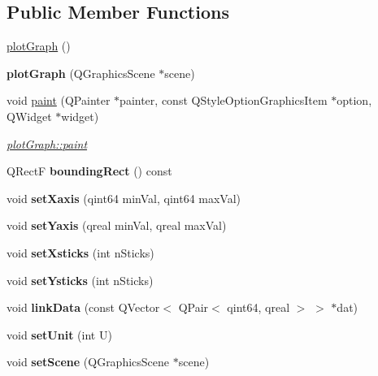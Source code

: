 \subsection*{Public Member Functions}
\begin{DoxyCompactItemize}
\item 
\hyperlink{classplotGraph_a53902ce2d9f08bfda697a887061b12ca}{plot\-Graph} ()
\item 
\hypertarget{classplotGraph_ab906e233fa8fb7af50314e62305d8ca6}{{\bfseries plot\-Graph} (Q\-Graphics\-Scene $\ast$scene)}\label{classplotGraph_ab906e233fa8fb7af50314e62305d8ca6}

\item 
void \hyperlink{classplotGraph_aa72b60c4f95834599921874fab85d01b}{paint} (Q\-Painter $\ast$painter, const Q\-Style\-Option\-Graphics\-Item $\ast$option, Q\-Widget $\ast$widget)
\begin{DoxyCompactList}\small\item\em \hyperlink{classplotGraph_aa72b60c4f95834599921874fab85d01b}{plot\-Graph\-::paint} \end{DoxyCompactList}\item 
\hypertarget{classplotGraph_a65061b6dda44811830977d80f46ed15e}{Q\-Rect\-F {\bfseries bounding\-Rect} () const }\label{classplotGraph_a65061b6dda44811830977d80f46ed15e}

\item 
\hypertarget{classplotGraph_a860f6e766de63d3a7a251f528dcc4be7}{void {\bfseries set\-Xaxis} (qint64 min\-Val, qint64 max\-Val)}\label{classplotGraph_a860f6e766de63d3a7a251f528dcc4be7}

\item 
\hypertarget{classplotGraph_a0e2e3589bfc5cc726e367bf8bdc8a2f5}{void {\bfseries set\-Yaxis} (qreal min\-Val, qreal max\-Val)}\label{classplotGraph_a0e2e3589bfc5cc726e367bf8bdc8a2f5}

\item 
\hypertarget{classplotGraph_ab78b439ee76e1f4df9a9e26ebcd3bc29}{void {\bfseries set\-Xsticks} (int n\-Sticks)}\label{classplotGraph_ab78b439ee76e1f4df9a9e26ebcd3bc29}

\item 
\hypertarget{classplotGraph_af5944ac87c177035eeeaf61d64b1a139}{void {\bfseries set\-Ysticks} (int n\-Sticks)}\label{classplotGraph_af5944ac87c177035eeeaf61d64b1a139}

\item 
\hypertarget{classplotGraph_a8eb89c53d633e0a9574f1670c9c0d644}{void {\bfseries link\-Data} (const Q\-Vector$<$ Q\-Pair$<$ qint64, qreal $>$ $>$ $\ast$dat)}\label{classplotGraph_a8eb89c53d633e0a9574f1670c9c0d644}

\item 
\hypertarget{classplotGraph_a09a7563bcd8a387e1d9bf3f534ecd990}{void {\bfseries set\-Unit} (int U)}\label{classplotGraph_a09a7563bcd8a387e1d9bf3f534ecd990}

\item 
\hypertarget{classplotGraph_ace55db051cab85e9a0c20795f4c2349a}{void {\bfseries set\-Scene} (Q\-Graphics\-Scene $\ast$scene)}\label{classplotGraph_ace55db051cab85e9a0c20795f4c2349a}

\end{DoxyCompactItemize}


